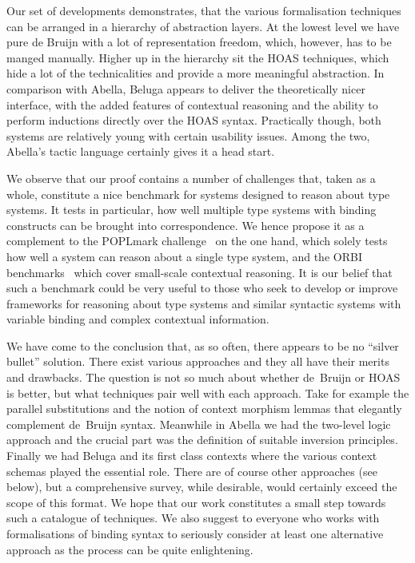 \documentclass[a4paper,UKenglish]{lipics-v2016}
\theoremstyle{plain}
\begin{document}
Our set of developments demonstrates, that the various formalisation techniques can be arranged in a hierarchy of abstraction layers.
At the lowest level we have pure de Bruijn with a lot of representation freedom, which, however, has to be manged manually.
Higher up in the hierarchy sit the HOAS techniques, which hide a lot of the technicalities and provide a more meaningful abstraction.
In comparison with Abella, Beluga appears to deliver the theoretically nicer interface, with the added features of contextual reasoning and the ability to perform inductions directly over the HOAS syntax.
Practically though, both systems are relatively young with certain usability issues.
Among the two, Abella's tactic language certainly gives it a head start.

We observe that our proof contains a number of challenges that, taken as a whole, constitute a nice benchmark for systems designed to reason about type systems.
It tests in particular, how well multiple type systems with binding constructs can be brought into correspondence.
We hence propose it as a complement to the POPLmark challenge~\cite{poplmark} on the one hand, which solely tests how well a system can reason about a single type system, and the ORBI benchmarks~\cite{Felty:ITP10,Felty:orbi-survey} which cover small-scale contextual reasoning.
It is our belief that such a benchmark could be very useful to those who seek to develop or improve frameworks for reasoning about type systems and similar syntactic systems with variable binding and complex contextual information.

We have come to the conclusion that, as so often, there appears to be no ``silver bullet'' solution.
There exist various approaches and they all have their merits and drawbacks.
The question is not so much about whether de~Bruijn or HOAS is better, but what techniques pair well with each approach.
Take for example the parallel substitutions and the notion of context morphism lemmas that elegantly complement de~Bruijn syntax.
Meanwhile in Abella we had the two-level logic approach and the crucial part was the definition of suitable inversion principles.
Finally we had Beluga and its first class contexts where the various context schemas played the essential role.
There are of course other approaches (see below), but a comprehensive survey, while desirable, would certainly exceed the scope of this format.
We hope that our work constitutes a small step towards such a catalogue of techniques.
We also suggest to everyone who works with formalisations of binding syntax to seriously consider at least one alternative approach as the process can be quite enlightening.
\end{document}
